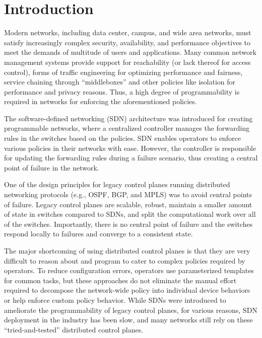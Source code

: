 \section{Introduction}
Modern networks, including data center, campus, 
and wide area networks, 
must satisfy increasingly complex security, 
availability, and performance objectives to 
meet the demands of multitude of users and applications. 
Many common network management systems provide support
for reachability (or lack thereof for access control),
forms of traffic engineering for optimizing performance
and fairness, service chaining through ``middleboxes'' and
other policies like isolation for performance and privacy reasons.
Thus, a high degree of programmability is required in networks
for enforcing the aforementioned policies.

The software-defined networking (SDN) architecture was introduced
for creating programmable networks, where a centralized controller
manages the forwarding rules in the switches based on the policies.
SDN enables operators to enforce various policies in their networks 
with ease. 
However, the controller is responsible for updating the forwarding
rules during a failure scenario, thus creating a central point of 
failure in the network. 

One of the design principles
for legacy control planes running distributed networking protocols 
(e.g., OSPF, BGP, and MPLS) was to avoid central points of failure.
Legacy control planes are scalable, robust, maintain a smaller amount 
of state in switches compared to SDNs, 
and split the computational work over all of the switches. 
Importantly, there is no central point of failure and the switches
respond locally to failures and converge to a consistent state. 

The major shortcoming of using distributed control planes is that
they are very difficult to reason about and program to cater to 
complex policies required by operators. To reduce configuration 
errors, operators use parameterized templates for common
tasks, but these approaches do not eliminate the manual effort
required to decompose the network-wide policy into individual device
behaviors or help enforce custom policy behavior. While SDNs 
were introduced to ameliorate the programmability of legacy control planes, 
for various reasons, 
SDN deployment in the industry has been slow, and many 
networks still rely on these ``tried-and-tested'' distributed 
control planes. 


